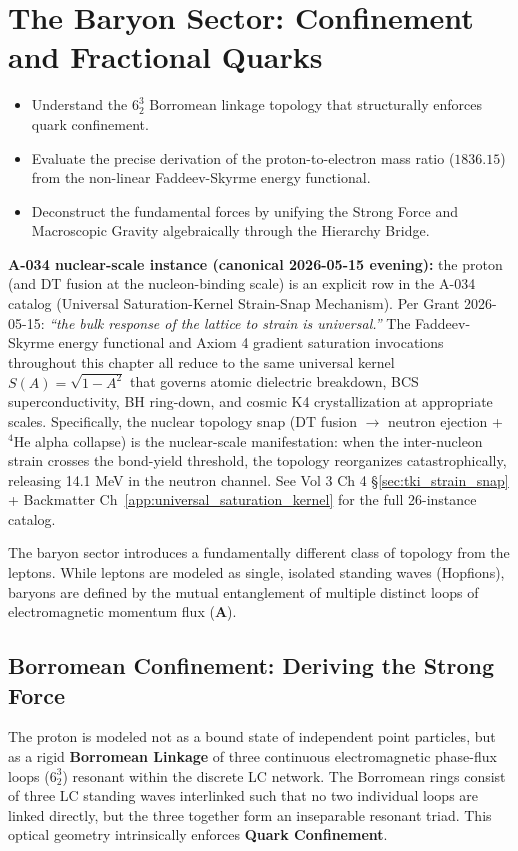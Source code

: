\chapter{The Baryon Sector: Confinement and Fractional Quarks}
\label{ch:baryons}

\begin{objectivebox}
\begin{itemize}
    \item Understand the $6^3_2$ Borromean linkage topology that structurally enforces quark confinement.
    \item Evaluate the precise derivation of the proton-to-electron mass ratio ($1836.15$) from the non-linear Faddeev-Skyrme energy functional.
    \item Deconstruct the fundamental forces by unifying the Strong Force and Macroscopic Gravity algebraically through the Hierarchy Bridge.
\end{itemize}
\end{objectivebox}

\textbf{A-034 nuclear-scale instance (canonical 2026-05-15 evening):} the
proton (and DT fusion at the nucleon-binding scale) is an explicit row in
the A-034 catalog (Universal Saturation-Kernel Strain-Snap Mechanism). Per
Grant 2026-05-15: \emph{``the bulk response of the lattice to strain is
universal.''} The Faddeev-Skyrme energy functional and Axiom 4 gradient
saturation invocations throughout this chapter all reduce to the same
universal kernel $S(A) = \sqrt{1 - A^2}$ that governs atomic dielectric
breakdown, BCS superconductivity, BH ring-down, and cosmic K4 crystallization
at appropriate scales. Specifically, the nuclear topology snap (DT fusion
$\to$ neutron ejection + $^4$He alpha collapse) is the nuclear-scale
manifestation: when the inter-nucleon strain crosses the bond-yield
threshold, the topology reorganizes catastrophically, releasing 14.1 MeV
in the neutron channel. See Vol 3 Ch 4 \S\ref{sec:tki_strain_snap}
+ Backmatter Ch~\ref{app:universal_saturation_kernel} for the full 26-instance
catalog.

The baryon sector introduces a fundamentally different class of topology from the leptons. While leptons are modeled as single, isolated standing waves (Hopfions), baryons are defined by the mutual entanglement of multiple distinct loops of electromagnetic momentum flux ($\mathbf{A}$).

\section{Borromean Confinement: Deriving the Strong Force}
The proton is modeled not as a bound state of independent point particles, but as a rigid \textbf{Borromean Linkage} of three continuous electromagnetic phase-flux loops ($6^3_2$) resonant within the discrete LC network. The Borromean rings consist of three LC standing waves interlinked such that no two individual loops are linked directly, but the three together form an inseparable resonant triad. This optical geometry intrinsically enforces \textbf{Quark Confinement}.

